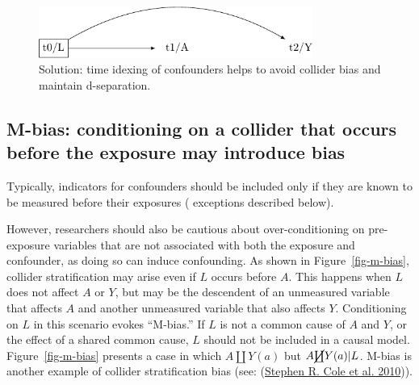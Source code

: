\documentclass[
  singlecolumn]{report}
\begin{document}
\begin{figure}

{\centering \includegraphics[width=0.8\textwidth,height=\textheight]{causal-dags_files/figure-pdf/fig-dag-common-effect-solution-1.pdf}

}

\caption{\label{fig-dag-common-effect-solution}Solution: time idexing of
confounders helps to avoid collider bias and maintain d-separation.}

\end{figure}

\hypertarget{m-bias-conditioning-on-a-collider-that-occurs-before-the-exposure-may-introduce-bias}{%
\subsection{M-bias: conditioning on a collider that occurs before the
exposure may introduce
bias}\label{m-bias-conditioning-on-a-collider-that-occurs-before-the-exposure-may-introduce-bias}}

Typically, indicators for confounders should be included only if they
are known to be measured before their exposures ( exceptions described
below).

However, researchers should also be cautious about over-conditioning on
pre-exposure variables that are not associated with both the exposure
and confounder, as doing so can induce confounding. As shown in
Figure~\ref{fig-m-bias}, collider stratification may arise even if \(L\)
occurs before \(A\). This happens when \(L\) does not affect \(A\) or
\(Y\), but may be the descendent of an unmeasured variable that affects
\(A\) and another unmeasured variable that also affects \(Y\).
Conditioning on \(L\) in this scenario evokes ``M-bias.'' If \(L\) is
not a common cause of \(A\) and \(Y\), or the effect of a shared common
cause, \(L\) should not be included in a causal model.
Figure~\ref{fig-m-bias} presents a case in which \(A \coprod Y(a)\) but
\(A \cancel{\coprod} Y(a)| L\). M-bias is another example of collider
stratification bias (see: (\protect\hyperlink{ref-cole2010}{Stephen R.
Cole et al. 2010})).
\end{document}
